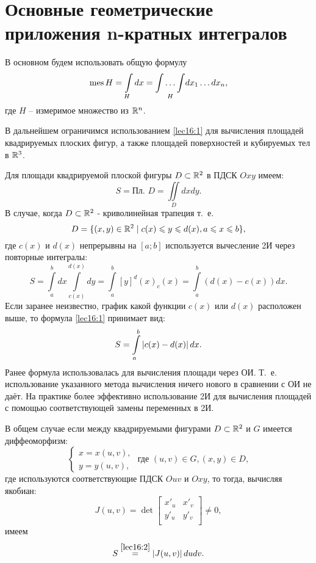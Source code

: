 \documentclass[../../main.tex]{subfiles}
\begin{document}
\section{Основные геометрические приложения n-кратных интегралов}

В основном будем использовать общую формулу
\begin{equation}
\label{lec16:1}
\operatorname{mes} H = \int\limits_Hdx = \underset{H}{\int \ldots \int}dx_1 \ldots dx_n,
\end{equation}
где $H$ -- измеримое множество из $\mathbb{R}^n$.

В дальнейшем ограничимся
использованием \eqref{lec16:1} для вычисления площадей квадрируемых плоских
фигур, а также площадей поверхностей и кубируемых тел в $\mathbb{R}^{3}$.

Для площади квадрируемой плоской фигуры $D \subset \mathbb{R}^{2}$ в ПДСК
$Oxy$ имеем:
\begin{equation}
\label{lec16:2}
S = \text{Пл. } D = \iint\limits_Ddxdy.
\end{equation}
В случае, когда $D \subset \mathbb{R}^{2}$ - криволинейная трапеция т.~е. 
\begin{equation}
\label{lec16:3}
	D=\{
	(x,y)\in \mathbb{R}^2 \mid c(x)\leqslant y\leqslant d(x), a\leqslant x \leqslant b
	\},
\end{equation}
где $c(x)$ и $d(x)$ непрерывны на $\left[a; b\right]$
 используется вычесление 2И через повторные интегралы:
\begin{equation}
\label{lec16:4}
S = \int\limits_a^bdx\int\limits_{c(x)}^{d(x)}dy = 
\int\limits_a^b\left[y\right]^d(x)_c(x)
=\int\limits_a^b(d(x) - c(x))dx.
\end{equation}
Если заранее неизвестно, график какой функции  $c(x)$ или $d(x)$ 
расположен выше, то формула \eqref{lec16:1} принимает вид:
\begin{equation}
\label{lec16:5}
S =  \int\limits_a^b\left|{c(x) - d(x)}\right|dx.
\end{equation}
Ранее формула использовалась для вычисления
 площади через ОИ. Т.~е. использование
  указанного метода вычисления {ничего нового}
в сравнении с ОИ не даёт. На практике
 более эффективно использование 2И для
  вычисления площадей с помощью соответствующей замены переменных в 2И.


В общем случае если между квадрируемыми фигурами 
$D\subset \mathbb{R}^2$ и $G$ имеется диффеоморфизм:
\begin{equation*}
\begin{cases}
x = x(u, v), \\
y = y(u, v),
\end{cases}
\text{ где }  (u, v) \in G, (x, y) \in D,
\end{equation*}
где используются соответствующие ПДСК $Ouv$ и $Oxy$, 
то тогда, вычисляя якобиан:
\begin{equation*}
J(u,v) = \det
\begin{bmatrix}
x'_u & x'_v\\
y'_u & y'_v\\
\end{bmatrix}
\neq 0,
\end{equation*}
имеем
\begin{equation}
\label{lec16:6}
S \overset{\ref{lec16:2}}{=}  \left|{ J(u,v)}\right| dudv.
\end{equation}
\end{document}
